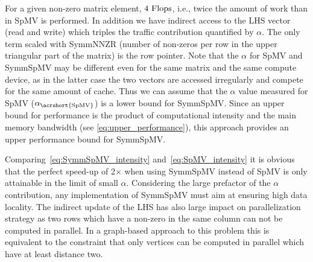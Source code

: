 For a given non-zero matrix element, $4~\mbox{Flops}$, i.e., twice the amount of work than in \acrshort{SpMV} is performed. In addition we have indirect access to the LHS vector (read and write) which triples the traffic contribution quantified by $\alpha$\@. The only term scaled with \acrshort{SymmNNZR} (number of non-zeros per row in the upper triangular part of the matrix) is the row pointer. Note that the $\alpha$ for \acrshort{SpMV} and \acrshort{SymmSpMV} may be different even for the same matrix and the same compute device, as in the latter case the two vectors are accessed irregularly and compete for the same amount of cache. Thus we can assume that the $\alpha$ value measured for \acrshort{SpMV} ($\alpha_\mathrm{\acrshort{SpMV}}$) is a lower bound for \acrshort{SymmSpMV}. Since an upper bound for performance is the product of computational intensity and the main memory bandwidth (see \cref{eq:upper_performance}), this approach provides an upper performance bound for \acrshort{SymmSpMV}.
\begin{comment}
 for a given matrix structure:
 \begin{align}
\label{eq:SymmSpMV_performance}
P^{max}_\mathrm{\acrshort{SymmSpMV}}  &= I_\mathrm{\acrshort{SymmSpMV}} (\alpha_\mathrm{\acrshort{SpMV}})  \times b_S
\end{align}
As most matrices have a considerable number of non-zeros per row, we chose $b_S$ to be the optimistic (load-only) value  from~\cref{tab:test_bed}.
\end{comment}

Comparing~\cref{eq:SymmSpMV_intensity} and~\cref{eq:SpMV_intensity} it is obvious that the perfect speed-up of 2$\times$ when using \acrshort{SymmSpMV} instead of \acrshort{SpMV} is only attainable in the limit of small $\alpha$\@. 
Considering the large prefactor of the $\alpha$ contribution, any implementation of \acrshort{SymmSpMV} must aim at ensuring high data locality. The indirect update of the LHS has also large impact on parallelization strategy as two rows which have a non-zero in the same column can not be computed in parallel. In a graph-based approach to this problem this is equivalent to the constraint that only vertices can be computed in parallel which have at least distance two.

